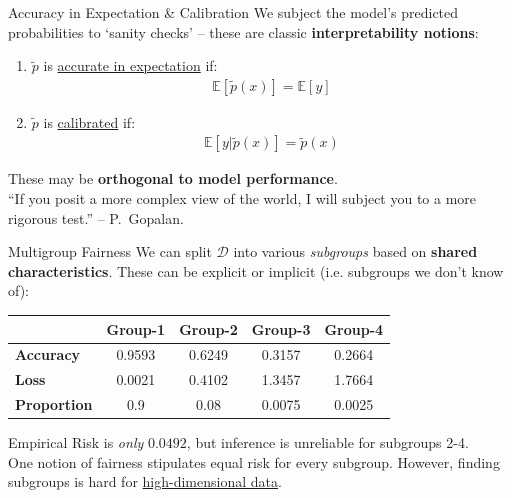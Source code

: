 \documentclass{beamer}
\begin{document}
\begin{frame}{Accuracy in Expectation \& Calibration}
	We subject the model's predicted probabilities to `sanity checks' \pause -- these are classic \textbf{interpretability notions}:
	\begin{enumerate}[label=\alph*.]
		\item $\tilde{p}$ is \underline{accurate in expectation} if:
			\begin{gather}
				\mathbb{E}[\tilde{p}(x)] = \mathbb{E}[y]
			\end{gather} \pause
			\vspace{-1em}
		\item $\tilde{p}$ is \underline{calibrated} if:
			\begin{gather}
				\mathbb{E}[y|\tilde{p}(x)] = \tilde{p}(x)
			\end{gather} %
	\end{enumerate} \pause
	These may be \textbf{orthogonal to model performance}. \pause \newline \\

	``If you posit a more complex view of the world, I will subject you to a more rigorous test.'' -- P.~Gopalan.
\end{frame}

\begin{frame}{Multigroup Fairness}
	We can split $\mathcal{D}$ into various \textit{subgroups} based on \textbf{shared characteristics}. These can be explicit or implicit (i.e. subgroups we don't know of):
	\begin{table}[t]
		\begin{center}
			\begin{tabular}{lcccc}
				\toprule
				& \bf Group-1 & \bf Group-2 & \bf Group-3 & \bf Group-4 \\
				\midrule
				\bf Accuracy & 0.9593 & 0.6249 & 0.3157 & 0.2664 \\
				\bf Loss & 0.0021 & 0.4102 & 1.3457 & 1.7664 \\
				\bf Proportion & 0.9 & 0.08 & 0.0075 & 0.0025 \\
				\bottomrule
			\end{tabular}
		\end{center}
	\end{table} \pause
	Empirical Risk is \textit{only} $0.0492$, but inference is unreliable for subgroups 2-4. \pause \newline \\

	One notion of fairness stipulates equal risk for every subgroup. However, finding subgroups is hard for \underline{high-dimensional data}.
\end{frame}
\end{document}
